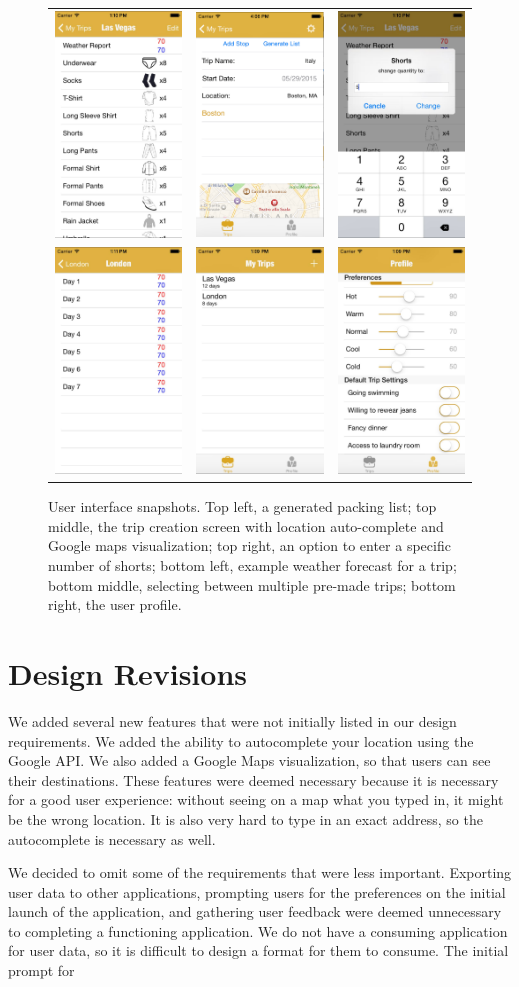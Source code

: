 \documentclass[11pt]{article}
\begin{document}
\begin{figure}
    \centering
    \begin{tabular}{ccc}
    \includegraphics[scale=0.2]{img/ui-2.jpg} & \includegraphics[width=151pt]{img/ui-8.png} & \includegraphics[scale=0.2]{img/ui-7.jpg}\\
    \includegraphics[scale=0.2]{img/ui-5.jpg} & \includegraphics[scale=0.2]{img/ui-6.jpg} & \includegraphics[scale=0.2]{img/ui-4.jpg}
    \end{tabular}
    \caption{User interface snapshots. Top left, a generated packing list; top middle, the trip creation screen with location auto-complete and Google maps visualization; top right, an option to enter a specific number of shorts; bottom left, example weather forecast for a trip; bottom middle, selecting between multiple pre-made trips; bottom right, the user profile.}
    \label{fig:ui}
\end{figure}

\section{Design Revisions}
We added several new features that were not initially listed in our design requirements. We added the ability to autocomplete your location using the Google API. We also added a Google Maps visualization, so that users can see their destinations. These features were deemed necessary because it is necessary for a good user experience: without seeing on a map what you typed in, it might be the wrong location. It is also very hard to type in an exact address, so the autocomplete is necessary as well.

We decided to omit some of the requirements that were less important. Exporting user data to other applications, prompting users for the preferences on the initial launch of the application, and gathering user feedback were deemed unnecessary to completing a functioning application. We do not have a consuming application for user data, so it is difficult to design a format for them to consume. The initial prompt for 
\end{document}
